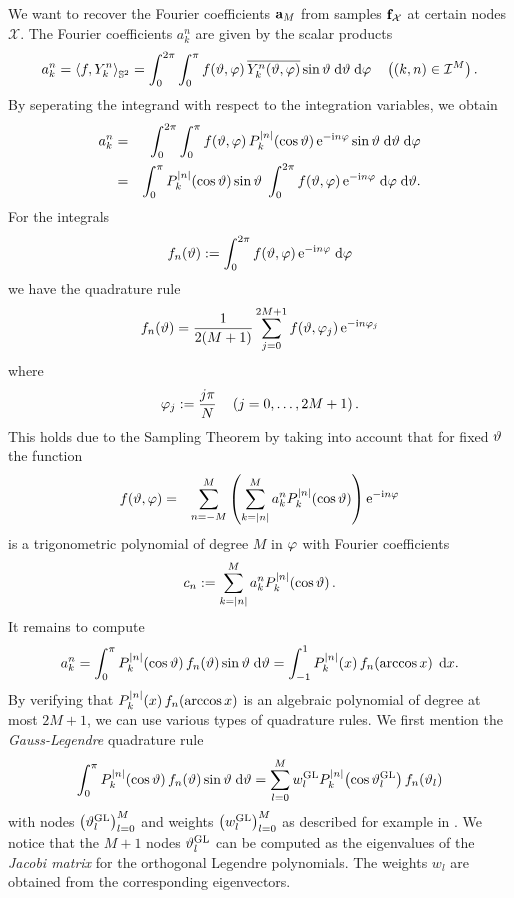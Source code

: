 We want to recover the Fourier coefficients $\mathbf{a}_{M}$ from samples $\mathbf{f}_{\mathcal{X}}$ at certain nodes $\mathcal{X}$. The 
Fourier coefficients $a_{k}^n$ are given by the scalar products
$$
  a_{k}^n = \left<f,Y_{k}^n\right>_{\mathbb{S}^2} = \int_{0}^{2\pi} \int_{0}^{\pi} f{\hspace{-0.4ex}}\left(\vartheta,\varphi\right) \overline{Y_{k}^n{\hspace{-0.4ex}}\left(\vartheta,\varphi\right)} \sin \vartheta \; \text{\rm{d}} \vartheta \; \text{\rm{d}} \varphi \quad \left(\left(k,n\right) \in \mathcal{I}^M\right).
$$
By seperating the integrand with respect to the integration variables, we obtain
\begin{eqnarray*}
  a_{k}^n & = & \int_{0}^{2\pi} \int_{0}^{\pi} f{\hspace{-0.4ex}}\left(\vartheta,\varphi\right) P_{k}^{\left\vert n\right\vert}{\hspace{-0.4ex}}\left(\cos \vartheta\right) \mbox{\rm{e}}^{-\mbox{\scriptsize\rm{i}} n \varphi} \sin \vartheta \; \text{\rm{d}} \vartheta \; \text{\rm{d}} \varphi\\
          & = & \int_{0}^{\pi} P_{k}^{\left\vert n\right\vert}{\hspace{-0.4ex}}\left(\cos \vartheta\right) \sin \vartheta \; \int_{0}^{2\pi} f{\hspace{-0.4ex}}\left(\vartheta,\varphi\right) \mbox{\rm{e}}^{-\mbox{\scriptsize\rm{i}} n \varphi} \; \text{\rm{d}} \varphi \; \text{\rm{d}} \vartheta.
\end{eqnarray*}
For the integrals
$$
  f_{n}{\hspace{-0.4ex}}\left(\vartheta\right) := \int_{0}^{2\pi} f{\hspace{-0.4ex}}\left(\vartheta,\varphi\right) \mbox{\rm{e}}^{-\mbox{\scriptsize\rm{i}} n \varphi} \; \text{\rm{d}} \varphi
$$
we have the quadrature rule
$$ f_{n}{\hspace{-0.4ex}}\left(\vartheta\right) = \frac{1}{2(M+1)} \sum_{j=0}^{2M+1} f{\hspace{-0.4ex}}\left(\vartheta,\varphi_{j}\right) \mbox{\rm{e}}^{-\mbox{\scriptsize\rm{i}} n \varphi_{j}}$$
where
$$ \varphi_{j} := \frac{j\pi}{N} \quad \left(j=0,\ldots,2M+1\right). $$
This holds due to the Sampling Theorem by taking into account that for fixed $\vartheta$ the function
\begin{eqnarray*}
  f{\hspace{-0.4ex}}\left(\vartheta,\varphi\right) & = & \sum_{n=-M}^{M} \left(\sum_{k=\left\vert n\right\vert}^M a_{k}^n P_{k}^{\left\vert n\right\vert}{\hspace{-0.4ex}}\left(\cos \vartheta\right)\right) \mbox{\rm{e}}^{-\mbox{\scriptsize\rm{i}} n \varphi}\\
\end{eqnarray*}
is a trigonometric polynomial of degree $M$ in $\varphi$ with Fourier coefficients
$$
  c_{n} := \sum_{k=\left\vert n\right\vert}^M a_{k}^n P_{k}^{\left\vert n\right\vert}{\hspace{-0.4ex}}\left(\cos \vartheta\right).
$$
It remains to compute
$$
  a_{k}^n = \int_{0}^{\pi} P_{k}^{\left\vert n\right\vert}{\hspace{-0.4ex}}\left(\cos \vartheta\right) f_{n}{\hspace{-0.4ex}}\left(\vartheta\right) \sin \vartheta \; \text{\rm{d}} \vartheta = 
  \int_{-1}^1 P_{k}^{\left\vert n\right\vert}{\hspace{-0.4ex}}\left(x\right) f_{n}{\hspace{-0.4ex}}\left(\arccos x\right) \; \text{\rm{d}} x.
$$
By verifying that $P_{k}^{\left\vert n\right\vert}{\hspace{-0.4ex}}\left(x\right) f_{n}{\hspace{-0.4ex}}\left(\arccos x\right)$ is an algebraic polynomial of degree at most $2M+1$, 
we can use various types of quadrature rules. We first mention the \emph{Gauss-Legendre} quadrature rule
$$
  \int_{0}^{\pi} P_{k}^{\left\vert n\right\vert}{\hspace{-0.4ex}}\left(\cos \vartheta\right) f_{n}{\hspace{-0.4ex}}\left(\vartheta\right) \sin \vartheta \; \text{\rm{d}} \vartheta = \sum_{l=0}^{M} w_{l}^{\mbox{\scriptsize\rm{GL}}} P_{k}^{\left\vert n\right\vert}{\hspace{-0.4ex}}\left(\cos \vartheta_{l}^{\mbox{\scriptsize\rm{GL}}}\right) f_{n}{\hspace{-0.4ex}}\left(\vartheta_{l}\right) 
$$
with nodes $\left(\vartheta_{l}^{\mbox{\scriptsize\rm{GL}}}\right)_{l=0}^M$ and weights $\left(w_{l}^{\mbox{\scriptsize\rm{GL}}}\right)_{l=0}^M$ as described for example in \cite{boehme02}. 
We notice that the $M+1$ nodes $\vartheta_{l}^{\mbox{\scriptsize\rm{GL}}}$ can be computed as the eigenvalues of the \emph{Jacobi matrix} for the orthogonal 
Legendre polynomials. The weights $w_{l}$ are obtained from the corresponding eigenvectors.

